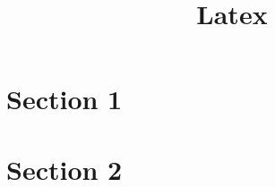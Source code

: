\documentclass{article}
\title{Latex}
\author{}
\date{}
\begin{document}
\maketitle
\section{Section 1}
\lipsum[1-2] %
\section{Section 2}
\lipsum[2-3] %
\end{document}
